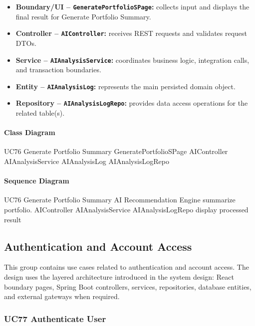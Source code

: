 \begin{itemize}
    \item \textbf{Boundary/UI -- \texttt{GeneratePortfolioSPage}:} collects input and displays the final result for Generate Portfolio Summary.
    \item \textbf{Controller -- \texttt{AIController}:} receives REST requests and validates request DTOs.
    \item \textbf{Service -- \texttt{AIAnalysisService}:} coordinates business logic, integration calls, and transaction boundaries.
    \item \textbf{Entity -- \texttt{AIAnalysisLog}:} represents the main persisted domain object.
    \item \textbf{Repository -- \texttt{AIAnalysisLogRepo}:} provides data access operations for the related table(s).
\end{itemize}

\paragraph{Class Diagram}

\ClassDiagram
{UC76 Generate Portfolio Summary}
{GeneratePortfolioSPage}
{AIController}
{AIAnalysisService}
{AIAnalysisLog}
{AIAnalysisLogRepo}

\paragraph{Sequence Diagram}

\SequenceDiagram
{UC76 Generate Portfolio Summary}
{AI Recommendation Engine}
{summarize portfolio.}
{AIController}
{AIAnalysisService}
{AIAnalysisLogRepo}
{display processed result}

\subsection{Authentication and Account Access}

This group contains use cases related to authentication and account access. The design uses the layered architecture introduced in the system design: React boundary pages, Spring Boot controllers, services, repositories, database entities, and external gateways when required.

\subsubsection{UC77 Authenticate User}

